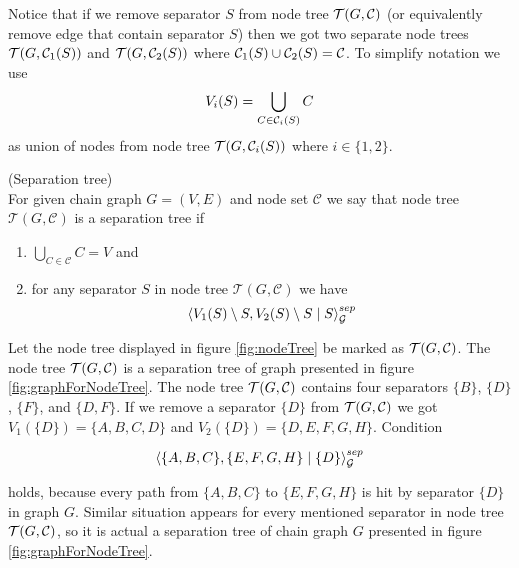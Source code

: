 Notice that if we remove separator $S$ from node tree $\mathcal{T}(G, \mathcal{C})$ (or equivalently remove edge that contain separator $S$) then we got two separate node trees $\mathcal{T}(G, \mathcal{C}_1(S))$ and $\mathcal{T}(G, \mathcal{C}_2(S))$ where 
$\mathcal{C}_1(S) \cup \mathcal{C}_2(S) = \mathcal{C}$. To simplify notation we use 
$$ V_i(S) = \bigcup_{C \in \mathcal{C}_i(S)} C$$
as union of nodes from node tree $\mathcal{T}(G, \mathcal{C}_i(S))$ where $i \in \{1, 2\}$.

\begin{defi} (Separation tree) \\
	For given chain graph $G = (V, E)$ and node set $\mathcal{C}$ we say that node tree $\mathcal{T}(G, \mathcal{C})$
	is a separation tree if 

	\begin{enumerate}
		\item $\bigcup_{C \in \mathcal{C}} C = V$ and
		\item for any separator $S$ in node tree $\mathcal{T}(G, \mathcal{C})$ we have  
		$$ \left\langle V_1(S) \setminus S , V_2(S) \setminus S \mid S \right\rangle_{\mathcal{G}}^{sep} $$
	\end{enumerate}	
	
\end{defi}
Let the node tree displayed in figure \ref{fig:nodeTree} be marked as $\mathcal{T}(G, \mathcal{C})$. The node tree $\mathcal{T}(G, \mathcal{C})$ is a separation tree of graph presented in figure \ref{fig:graphForNodeTree}. 
The node tree $\mathcal{T}(G, \mathcal{C})$ contains four separators $\{B \}$, $\{D \}$, $\{F \}$, and $\{D, F \}$. If we remove a separator $\{D \}$ from $\mathcal{T}(G, \mathcal{C})$ we got $V_1(\{D \}) = \{A, B, C, D \}$ 
and $V_2(\{D \}) = \{ D, E, F, G, H \}$. Condition 

\begin{equation}
	\left\langle  \{A, B, C\}  ,  \{ E, F, G, H \}  \mid  \{ D \}  \right\rangle_{\mathcal{G}}^{sep}
\end{equation}

holds, because every path from $\{A, B, C\}$ to $\{ E, F, G, H \}$ is hit by separator $\{ D\}$ in graph $G$. 
Similar situation appears for every mentioned separator in node tree $\mathcal{T}(G, \mathcal{C})$, so it is actual a separation
tree of chain graph $G$ presented in figure \ref{fig:graphForNodeTree}.



